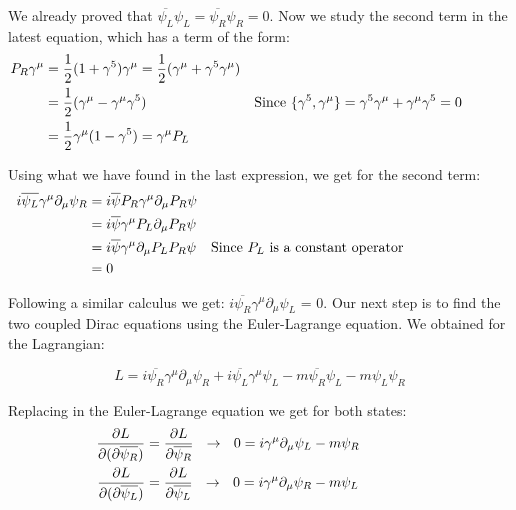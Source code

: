We already proved that $\overline{\psi_L}\psi_L = \overline{\psi_R}\psi_R = 0$. Now we study the second term in the latest equation, which has a term of the form:
\begin{align}
  &\begin{aligned}
     \mathllap{P_R\gamma^\mu}  &= \frac{1}{2} (1 + \gamma^5)\gamma^\mu = \frac{1}{2} (\gamma^\mu + \gamma^5 \gamma^\mu) \\        
     \mathllap{}            &= \frac{1}{2} (\gamma^\mu - \gamma^\mu \gamma^5) & \text{Since $\{\gamma^5,\gamma^\mu\} = \gamma^5\gamma^\mu + \gamma^\mu \gamma^5 = 0$} \\
     \mathllap{}            &= \frac{1}{2} \gamma^\mu (1 - \gamma^5) = \gamma^\mu P_L 
  &\end{aligned}
\end{align}

Using what we have found in the last expression, we get for the second term:
\begin{align}
  &\begin{aligned}
     \mathllap{i\overline{\psi_L}\gamma^\mu \partial_\mu \psi_R}  &=  i \overline{\psi}P_R \gamma^\mu \partial_\mu P_R \psi\\        
     \mathllap{}            &=  i \overline{\psi}\gamma^\mu P_L \partial_\mu P_R\psi \\
     \mathllap{}            &=  i \overline{\psi}\gamma^\mu \partial_\mu P_L P_R \psi && \text{Since $P_L$ is a constant operator}\\
     \mathllap{}            &=  0
  &\end{aligned}
\end{align}

Following a similar calculus we get: $i\overline{\psi_R}\gamma^\mu \partial_\mu \psi_L$ = 0. Our next step is to find the two coupled Dirac equations using the Euler-Lagrange equation. We obtained for the Lagrangian:

\begin{equation}
L = i \overline{\psi_R} \gamma^\mu \partial_\mu \psi_R + i \overline{\psi_L}\gamma^\mu \psi_L -m\overline{\psi_R}\psi_L - m \psi_L\psi_R
\end{equation}

Replacing in the Euler-Lagrange equation we get for both states:
\begin{align}
  &\begin{aligned}\label{major start}
     \mathllap{\frac{\partial L}{\partial(\partial \overline{\psi_R})}}  &=  \frac{\partial L}{\partial \overline{\psi_R}} \ \ \rightarrow \ \ 0 = i \gamma^\mu \partial_\mu \psi_L -m \psi_R  \\        
     \mathllap{\frac{\partial L}{\partial(\partial \overline{\psi_L})}}  &=  \frac{\partial L}{\partial \overline{\psi_L}} \ \ \rightarrow \ \ 0 = i \gamma^\mu \partial_\mu \psi_R -m \psi_L\\ 
  &\end{aligned} 
\end{align}

